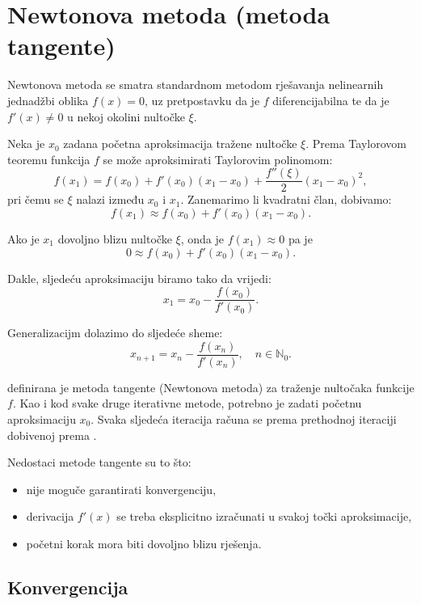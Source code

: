 \section{Newtonova metoda (metoda tangente)}

Newtonova metoda se smatra standardnom metodom rješavanja nelinearnih jednadžbi
oblika $f(x)=0$, uz pretpostavku da je $f$ diferencijabilna te da je $f'(x) \neq
0$ u nekoj okolini nultočke $\xi$.

Neka je $x_0$ zadana početna aproksimacija tražene nultočke $\xi$. Prema
Taylorovom teoremu funkcija $f$ se može aproksimirati Taylorovim polinomom:
$$
f(x_1) = f(x_0) + f'(x_0)(x_1-x_0)+\dfrac{f''(\xi)}{2}(x_1-x_0)^2,
$$
pri čemu se $\xi$ nalazi između $x_0$ i $x_1$. Zanemarimo li kvadratni član,
dobivamo:
$$
f(x_1) \approx f(x_0) + f'(x_0)(x_1-x_0).
$$

Ako je $x_1$ dovoljno blizu nultočke $\xi$, onda je $f(x_1)\approx 0$ pa je
$$
0 \approx f(x_0) + f'(x_0)(x_1-x_0).
$$

Dakle, sljedeću aproksimaciju biramo tako da vrijedi:
$$
x_1 = x_0 - \dfrac{f(x_0)}{f'(x_0)}.
$$


Generalizacijm dolazimo do sljedeće sheme:
\begin{equation}
    \label{eq:metoda_tangente}
    x_{n+1} = x_n - \dfrac{f(x_n)}{f'(x_n)},\quad n \in \mathbb{N}_0.
\end{equation}

 definirana je metoda tangente (Newtonova
metoda) za traženje nultočaka funkcije $f$. Kao i kod svake druge iterativne
metode, potrebno je zadati početnu aproksimaciju $x_0$. Svaka sljedeća iteracija
računa se prema prethodnoj iteraciji dobivenoj prema
.

Nedostaci metode tangente su to što:
\begin{itemize}
    \item nije moguče garantirati konvergenciju,
    \item derivacija $f'(x)$ se treba eksplicitno izračunati u svakoj točki
    aproksimacije,
    \item početni korak mora biti dovoljno blizu rješenja.
\end{itemize}


\subsection{Konvergencija}

